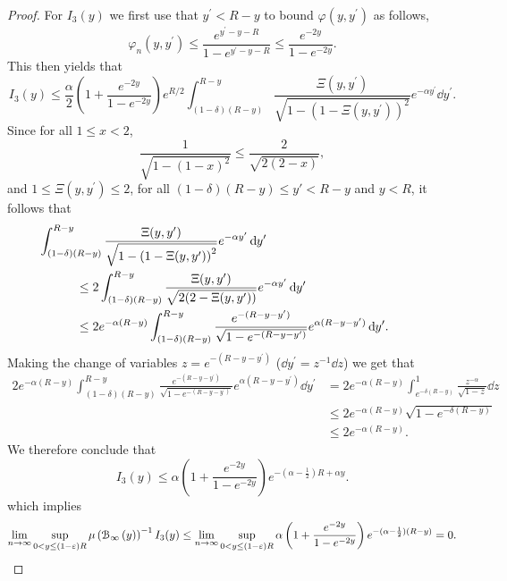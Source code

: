 \begin{proof}
For $I_3(y)$ we first use that $y^\prime < R - y$ to bound $\varphi(y,y^\prime)$ as follows,
\[
	\varphi_n(y,y^\prime) \le \frac{e^{y^\prime - y - R}}{1 - e^{y^\prime - y - R}} \le \frac{e^{-2y}}{1 - e^{-2y}}.
\]
This then yields that
\[
	I_3(y) \le \frac{\alpha}{2}\left(1 + \frac{e^{-2y}}{1 - e^{-2y}}\right)e^{R/2}
	\int_{(1-\delta)(R- y)}^{R - y} \frac{ \Xi(y,y^\prime)}{\sqrt{1 - \left(1 - \Xi(y,y^\prime)\right)^2}}
	e^{-\alpha y^\prime} \dd y^\prime.
\]
Since for all $1 \le x < 2$,
\[
	\frac{1}{\sqrt{1- (1-x)^2}} \le \frac{2}{\sqrt{2(2-x)}},
\]
and $1 \le \Xi(y,y^\prime) \le 2$, for all $(1-\delta)(R -y) \le y\prime < R-y$ and $y < R$, it follows that
\begin{align*}
	&\hspace{-30pt}\int_{(1-\delta)(R- y)}^{R - y} \frac{ \Xi(y,y^\prime)}{\sqrt{1 - \left(1 - \Xi(y,y^\prime)\right)^2}}
		e^{-\alpha y^\prime} \dd y^\prime \\
	&\le 2 \int_{(1-\delta)(R- y)}^{R - y} \frac{\Xi(y,y^\prime)}{\sqrt{2(2-\Xi(y,y^\prime))}} e^{-\alpha y^\prime} 
		\dd y^\prime \\
	&\le 2 e^{-\alpha(R - y)} \int_{(1-\delta)(R- y)}^{R - y} 
		\frac{e^{-(R - y - y^\prime)}}{\sqrt{1 - e^{-(R - y - y^\prime)}}} e^{\alpha (R - y - y^\prime)} \dd y^\prime.
\end{align*}
Making the change of variables $z = e^{-(R - y - y^\prime)}$ ($\dd y^\prime = z^{-1} \dd z$) we get that
\begin{align*}
	2 e^{-\alpha(R - y)} \int_{(1-\delta)(R- y)}^{R - y} 
			\frac{e^{-(R - y - y^\prime)}}{\sqrt{1 - e^{-(R - y - y^\prime)}}} e^{\alpha (R - y - y^\prime)} \dd y^\prime
	&= 2 e^{-\alpha(R - y)} \int_{e^{-\delta (R - y)}}^{1} \frac{z^{-\alpha}}{\sqrt{1 - z}} \dd z\\
	&\le 2 e^{-\alpha(R - y)} \sqrt{1 - e^{-\delta (R - y)}}\\
	&\le 2 e^{-\alpha (R -y)}.
\end{align*}
We therefore conclude that
\[
	I_3(y) \le \alpha \left(1 + \frac{e^{-2y}}{1 - e^{-2y}}\right)e^{-(\alpha -\frac{1}{2})R + \alpha y}.
\]
which implies
\[
	\lim_{n \to \infty} \sup_{0 < y \le (1-\varepsilon)R} \mu\left({\mathcal B}_{\infty}\left(y\right)\right)^{-1} I_3(y) 
	\le \lim_{n \to \infty} \sup_{0 < y \le (1-\varepsilon)R} \alpha \left(1 + \frac{e^{-2y}}{1 - e^{-2y}}\right) e^{-(\alpha - \frac{1}{2})(R - y)} = 0.
\]


\end{proof}
